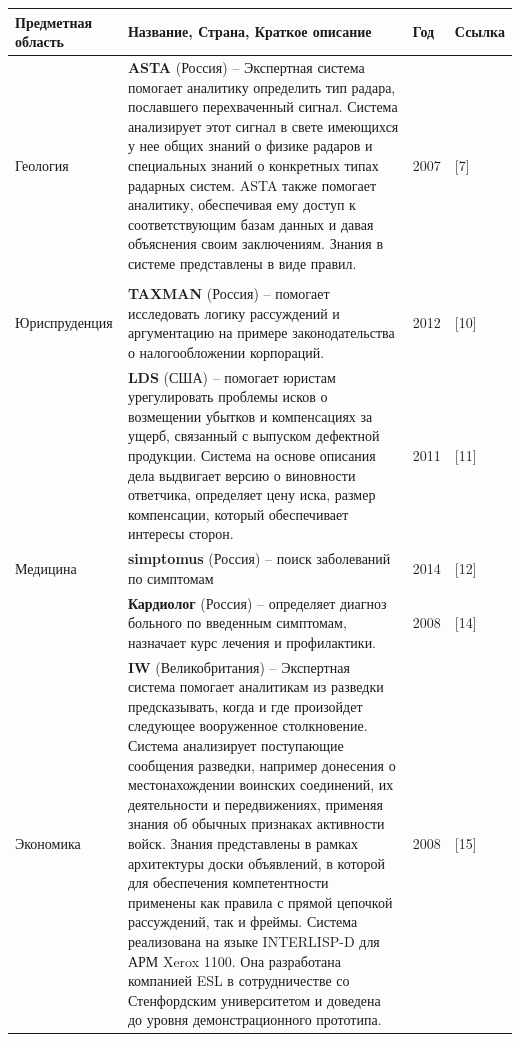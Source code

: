 \documentclass[14pt,a4paper,report]{report}
\begin{document}
\begin{table}[h!]
\centering
\bgroup
\def\arraystretch{1}
\begin{tabular}{ | P{2cm} | P{13cm} | P{1cm} | P{0.5cm} | }
\hline
Предметная область & Название, Страна, Краткое описание & Год & Ссылка 
\\ \hline

Геология 


& \textbf{ASTA} (Россия) -- Экспертная система помогает аналитику определить тип радара, пославшего перехваченный сигнал. Система анализирует этот сигнал в свете имеющихся у нее общих знаний о физике радаров и специальных знаний о конкретных типах радарных систем. ASTA также помогает аналитику, обеспечивая ему доступ к соответствующим базам данных и давая объяснения своим заключениям. Знания в системе представлены в виде правил. & 2007 & [7] \\ \hline

\\ \hline


Юриспруденция 



& \textbf{TAXMAN} (Россия) -- помогает исследовать логику рассуждений и аргументацию на примере законодательства о налогообложении корпораций. & 2012 & [10] \\ \hline

& \textbf{LDS} (США) -- помогает юристам урегулировать проблемы исков о возмещении убытков и компенсациях за ущерб, связанный с выпуском дефектной продукции. Система на основе описания дела выдвигает версию о виновности ответчика, определяет цену иска, размер компенсации, который обеспечивает интересы сторон. & 2011 & [11] \\ \hline


Медицина 

& \textbf{simptomus} (Россия) -- поиск заболеваний по симптомам & 2014 & [12] \\ \hline

& \textbf{Кардиолог} (Россия) -- определяет диагноз больного по введенным симптомам, назначает курс лечения и профилактики. & 2008 & [14] \\ \hline


Экономика 

& \textbf{IW} (Великобритания) -- Экспертная система помогает аналитикам из разведки предсказывать, когда и где произойдет следующее вооруженное столкновение. Система анализирует поступающие сообщения разведки, например донесения о местонахождении воинских соединений, их деятельности и передвижениях, применяя знания об обычных признаках активности войск. Знания представлены в рамках архитектуры доски объявлений, в которой для обеспечения компетентности применены как правила с прямой цепочкой рассуждений, так и фреймы. Система реализована на языке INTERLISP-D для АРМ Xerox 1100. Она разработана компанией ESL в сотрудничестве со Стенфордским университетом и доведена до уровня демонстрационного прототипа. & 2008 & [15] \\ \hline


\end{tabular}
\end{table}
\end{document}
